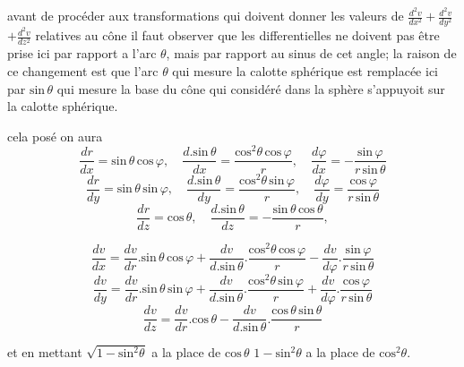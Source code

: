 \documentclass[11pt,a4paper]{article}
\begin{document}
avant de procéder aux transformations qui doivent donner les valeurs de $\frac{d^2v}{dx^2} + \frac{d^2v}{dy^2}$
$+ \frac{d^2v}{dz^2}$ relatives au cône il faut observer que les differentielles ne doivent pas
être prise ici par rapport a l'arc $\theta$, mais par rapport au sinus
de cet angle; la raison de ce changement est que l'arc $\theta$
qui mesure la calotte sphérique est remplacée ici par $\text{sin}\,\theta$ qui mesure
la base du cône qui considéré dans la sphère s'appuyoit sur
la calotte sphérique.

cela posé on aura
\[ \frac{dr}{dx} = \text{sin}\,\theta\,\text{cos}\,\varphi, \quad \frac{d.\text{sin}\,\theta}{dx} = \frac{\text{cos}^2\theta\,\text{cos}\,\varphi}{r}, \quad \frac{d\varphi}{dx} = -\frac{\text{sin}\,\varphi}{r\,\text{sin}\,\theta} \]
\[ \frac{dr}{dy} = \text{sin}\,\theta\,\text{sin}\,\varphi, \quad \frac{d.\text{sin}\,\theta}{dy} = \frac{\text{cos}^2\theta\,\text{sin}\,\varphi}{r}, \quad \frac{d\varphi}{dy} = \frac{\text{cos}\,\varphi}{r\,\text{sin}\,\theta} \]
\[ \frac{dr}{dz} = \text{cos}\,\theta, \quad \frac{d.\text{sin}\,\theta}{dz} = -\frac{\text{sin}\,\theta\,\text{cos}\,\theta}{r}, \]

\[ \frac{dv}{dx} = \frac{dv}{dr}.\text{sin}\,\theta\,\text{cos}\,\varphi + \frac{dv}{d.\text{sin}\,\theta}.\frac{\text{cos}^2\theta\,\text{cos}\,\varphi}{r} - \frac{dv}{d\varphi}.\frac{\text{sin}\,\varphi}{r\,\text{sin}\,\theta} \]
\[ \frac{dv}{dy} = \frac{dv}{dr}.\text{sin}\,\theta\,\text{sin}\,\varphi + \frac{dv}{d.\text{sin}\,\theta}.\frac{\text{cos}^2\theta\,\text{sin}\,\varphi}{r} + \frac{dv}{d\varphi}.\frac{\text{cos}\,\varphi}{r\,\text{sin}\,\theta} \]
\[ \frac{dv}{dz} = \frac{dv}{dr}.\text{cos}\,\theta - \frac{dv}{d.\text{sin}\,\theta}.\frac{\text{cos}\,\theta\,\text{sin}\,\theta}{r} \]

et en mettant $\sqrt{1-\text{sin}^2\theta}$ a la place de $\text{cos}\,\theta$ \quad $1-\text{sin}^2\theta$ a la place de $\text{cos}^2\theta$.
\end{document}
